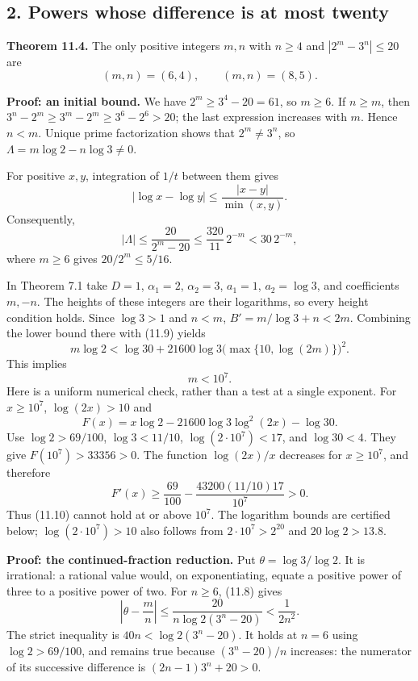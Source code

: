 \documentclass[
  11pt,
  a4paper,
]{article}
\begin{document}
\subsection{2. Powers whose difference is at most
twenty}\label{powers-whose-difference-is-at-most-twenty}

\textbf{Theorem 11.4.} The only positive integers \(m,n\) with \(n\ge4\)
and \(|2^m-3^n|\le20\) are \[
(m,n)=(6,4),\qquad (m,n)=(8,5).
\tag{11.7}
\]

\textbf{Proof: an initial bound.} We have \(2^m\ge3^4-20=61\), so
\(m\ge6\). If \(n\ge m\), then \(3^n-2^m\ge3^m-2^m\ge3^6-2^6>20\); the
last expression increases with \(m\). Hence \(n<m\). Unique prime
factorization shows that \(2^m\ne3^n\), so
\(\Lambda=m\log2-n\log3\ne0\).

For positive \(x,y\), integration of \(1/t\) between them gives \[
|\log x-\log y|\le\frac{|x-y|}{\min(x,y)}.
\tag{11.8}
\] Consequently, \[
|\Lambda|\le\frac{20}{2^m-20}
\le\frac{320}{11}\,2^{-m}<30\,2^{-m},
\tag{11.9}
\] where \(m\ge6\) gives \(20/2^m\le5/16\).

In Theorem 7.1 take \(D=1\), \(\alpha_1=2\), \(\alpha_2=3\), \(a_1=1\),
\(a_2=\log3\), and coefficients \(m,-n\). The heights of these integers
are their logarithms, so every height condition holds. Since \(\log3>1\)
and \(n<m\), \(B'=m/\log3+n<2m\). Combining the lower bound there with
(11.9) yields \[
m\log2<\log30+21600\log3\bigl(\max\{10,\log(2m)\}\bigr)^2.
\tag{11.10}
\] This implies \[
m<10^7.
\tag{11.11}
\] Here is a uniform numerical check, rather than a test at a single
exponent. For \(x\ge10^7\), \(\log(2x)>10\) and \[
F(x)=x\log2-21600\log3\log^2(2x)-\log30.
\] Use \(\log2>69/100\), \(\log3<11/10\), \(\log(2\cdot10^7)<17\), and
\(\log30<4\). They give \(F(10^7)>33356>0\). The function \(\log(2x)/x\)
decreases for \(x\ge10^7\), and therefore \[
F'(x)\ge\frac{69}{100}
-\frac{43200(11/10)17}{10^7}>0.
\] Thus (11.10) cannot hold at or above \(10^7\). The logarithm bounds
are certified below; \(\log(2\cdot10^7)>10\) also follows from
\(2\cdot10^7>2^{20}\) and \(20\log2>13.8\).

\textbf{Proof: the continued-fraction reduction.} Put
\(\theta=\log3/\log2\). It is irrational: a rational value would, on
exponentiating, equate a positive power of three to a positive power of
two. For \(n\ge6\), (11.8) gives \[
\left|\theta-\frac mn\right|
\le\frac{20}{n\log2(3^n-20)}<\frac1{2n^2}.
\tag{11.12}
\] The strict inequality is \(40n<\log2(3^n-20)\). It holds at \(n=6\)
using \(\log2>69/100\), and remains true because \((3^n-20)/n\)
increases: the numerator of its successive difference is
\((2n-1)3^n+20>0\).
\end{document}
